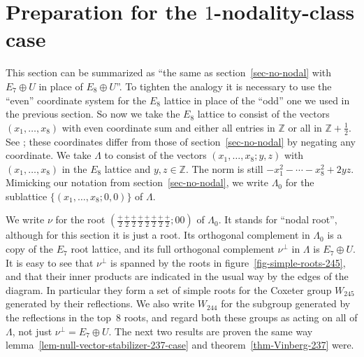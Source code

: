 \documentclass[12pt]{amsart}
\def\Z{\mathbb{Z}}     %
\numberwithin{theorem}{section}
\numberwithin{equation}{section}
\numberwithin{figure}{section}
\theoremstyle{remark}
\begin{document}
\section{Preparation for the $1$-nodality-class case}
\label{sec-preparation-for-1-nodal}

\noindent
This section can be summarized as ``the same as section~\ref{sec-no-nodal} with
$E_7\oplus U$ in place of $E_8\oplus U$''.  To tighten the analogy it
is necessary to use the ``even'' coordinate system for the $E_8$
lattice in place of the ``odd'' one we used in the previous section.
So now we take the $E_8$ lattice to consist of the vectors
$(x_1,\dots,x_8)$ with even coordinate sum and either all entries in
$\Z$ or all in $\Z+\frac12$.  See \cite[\S8.1 of
  Ch.\ 4]{Conway-Sloane}; these coordinates differ from those of
section~\ref{sec-no-nodal} by
negating any coordinate.  We take $\Lambda$ to consist of the vectors
$(x_1,\dots,x_8;y,z)$ with $(x_1,\dots,x_8)$ in the $E_8$ lattice and
$y,z\in\Z$.  The norm is still $-x_1^2-\cdots-x_8^2+2y
z$.  Mimicking our notation from section~\ref{sec-no-nodal}, we write $\Lambda_0$
for the sublattice $\{(x_1,\dots,x_8;0,0)\}$ of $\Lambda$.

We write $\nu$ for the root
$(\frac+2\frac+2\frac+2\frac+2\frac+2\frac+2\frac+2\frac+2;00)$ of
$\Lambda_0$.
It stands for ``nodal root'', although for this section it is just a root.
Its orthogonal complement in $\Lambda_0$ is a copy of
the $E_7$ root lattice, and its full orthogonal complement $\nu^\perp$
in $\Lambda$ is $E_7\oplus U$.  It is easy to see that $\nu^\perp$ is
spanned by the roots in figure~\ref{fig-simple-roots-245}, and that their inner products
are indicated in the usual way by the edges of the diagram.  In
particular they form a set of simple roots for the Coxeter group
$W_{245}$ generated by their reflections.  We also write $W_{244}$
for the subgroup generated by the reflections in the top~$8$ roots,
and regard both these groups as acting on all of $\Lambda$, not just
$\nu^\perp=E_7\oplus U$.  The next
two results are proven the same way lemma~\ref{lem-null-vector-stabilizer-237-case} and theorem~\ref{thm-Vinberg-237}
were.
\end{document}
